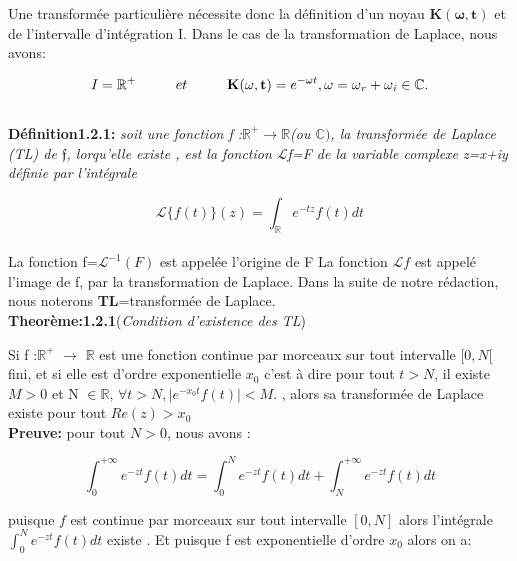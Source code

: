 \documentclass[12pt,a4paper]{report}
\begin{document}
Une transformée particulière nécessite donc la définition d'un noyau $\mathbf{K(\omega,t)}$ et de l'intervalle d'intégration I. 
Dans le cas de la transformation de Laplace, nous avons:
             
            \begin{displaymath}
  I=\mathbb{R^{+}} \hspace*{1 cm} et \hspace*{1cm} \mathbf{K(\omega,t)}=e^{-\omega t}, \mathit{\omega}={\mathit{\omega_r} +\mathit{\omega_i}} \in  \mathbb{C}.
            \end{displaymath}\\
            
\textbf{Définition1.2.1:} \textit{soit une fonction f :$\mathbb{R}^{+} \rightarrow \mathbb{R}$(ou $\mathbb{C})$, la transformée de Laplace (TL) de $\mathfrak{f}$, lorqu'elle existe , est la fonction $\mathcal{L}$f=F de la variable complexe z=x+iy définie par l'intégrale \\}

\begin{displaymath}
\mathcal{L} \lbrace f(t) \rbrace (z) = \int_{\mathbb{R}} e^{-tz} f(t) \mathit{dt}
\end{displaymath}\\

La fonction f=$\mathcal{L}^{-1}(F)$ est appelée l'origine de F
La fonction $\mathcal{L}f$ est appelé l'image de f, par la transformation de Laplace.
Dans la suite de notre rédaction, nous noterons \textbf{TL}=transformée de Laplace.\\


\textbf{Theorème:1.2.1}(\textit{Condition d'existence des \textit{TL}})

 Si  f :$\mathbb{R}^{+}$ $\rightarrow$ $\mathbb{R}$ est une fonction continue par morceaux sur tout intervalle $[0,N[$ fini, et si elle est d'ordre exponentielle $x_0$ c'est à dire  pour tout $t>N$, il existe $M>0$ et N $\in \mathbb{R}$, $ \forall t>N, \lvert e^{-x_0t} f(t) \rvert < M$. , alors sa transformée de Laplace existe pour tout $Re(z)>x_0$\\
 
\textbf{Preuve:} pour tout $N>0$, nous avons :

\[\int_{0}^{+ \infty} e^{-zt} f(t) \mathit{dt}=\int_{0}^{N} e^{-zt} f(t) \mathit{dt}  + \int_{N}^{+ \infty} e^{-zt} f(t) \mathit{dt}\]


puisque $f$ est continue par morceaux sur tout intervalle $\left[0,N \right] $ alors l'intégrale \(\int_{0}^{N} e^{-zt} f(t) \mathit{dt}\) existe . Et puisque f est exponentielle d'ordre $x_0$ alors on a:\\
\end{document}
